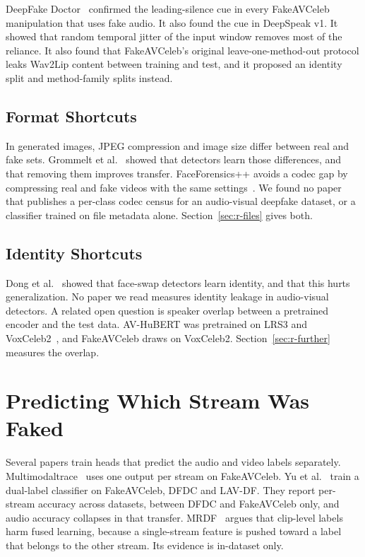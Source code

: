 DeepFake Doctor~\cite{deepfakedoctor} confirmed the leading-silence cue in
every FakeAVCeleb manipulation that uses fake audio. It also found the cue in
DeepSpeak v1. It showed that random temporal jitter of the input window
removes most of the reliance. It also found that FakeAVCeleb's original
leave-one-method-out protocol leaks Wav2Lip content between training and test,
and it proposed an identity split and method-family splits instead.

\subsection{Format Shortcuts}

In generated images, JPEG compression and image size differ between real and
fake sets. Grommelt et al.~\cite{grommelt2024} showed that detectors learn
those differences, and that removing them improves transfer. FaceForensics++
avoids a codec gap by compressing real and fake videos with the same
settings~\cite{ffpp}. We found no paper that publishes a per-class codec census
for an audio-visual deepfake dataset, or a classifier trained on file metadata
alone. Section~\ref{sec:r-files} gives both.

\subsection{Identity Shortcuts}

Dong et al.~\cite{dong2023} showed that face-swap detectors learn identity,
and that this hurts generalization. No paper we read measures identity leakage
in audio-visual detectors. A related open question is speaker overlap between
a pretrained encoder and the test data. AV-HuBERT was pretrained on LRS3 and
VoxCeleb2~\cite{voxceleb2}, and FakeAVCeleb draws on VoxCeleb2.
Section~\ref{sec:r-further} measures the overlap.

\section{Predicting Which Stream Was Faked}
\label{sec:l-modality}

Several papers train heads that predict the audio and video labels
separately. Multimodaltrace~\cite{multimodaltrace} uses one output per stream
on FakeAVCeleb. Yu et al.~\cite{yu2023} train a dual-label classifier on
FakeAVCeleb, DFDC and LAV-DF. They report per-stream accuracy across
datasets, between DFDC and FakeAVCeleb only, and audio accuracy collapses in
that transfer. MRDF~\cite{mrdf} argues that clip-level labels harm fused
learning, because a single-stream feature is pushed toward a label that
belongs to the other stream. Its evidence is in-dataset only.

